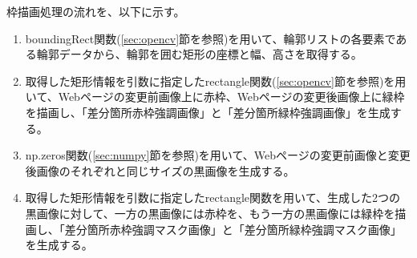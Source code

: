 \par
枠描画処理の流れを、以下に示す。
\begin{enumerate}
    \item boundingRect関数(\ref{sec:opencv}節を参照)を用いて、輪郭リストの各要素である輪郭データから、輪郭を囲む矩形の座標と幅、高さを取得する。
    \item 取得した矩形情報を引数に指定したrectangle関数(\ref{sec:opencv}節を参照)を用いて、Webページの変更前画像上に赤枠、Webページの変更後画像上に緑枠を描画し、「差分箇所赤枠強調画像」と「差分箇所緑枠強調画像」を生成する。
    \item np.zeros関数(\ref{sec:numpy}節を参照)を用いて、Webページの変更前画像と変更後画像のそれぞれと同じサイズの黒画像を生成する。
    \item 取得した矩形情報を引数に指定したrectangle関数を用いて、生成した2つの黒画像に対して、一方の黒画像には赤枠を、もう一方の黒画像には緑枠を描画し、「差分箇所赤枠強調マスク画像」と「差分箇所緑枠強調マスク画像」を生成する。
\end{enumerate}


